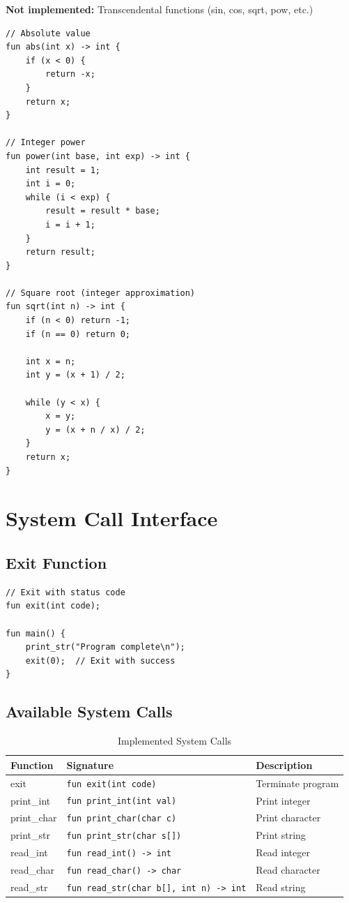 \documentclass[12pt,a4paper,oneside]{book}
\newcommand{\code}[1]{\texttt{#1}}
\begin{document}
\textbf{Not implemented:} Transcendental functions (sin, cos, sqrt, pow, etc.)

\begin{lstlisting}[style=algo, caption={User-Implemented Math Functions}]
// Absolute value
fun abs(int x) -> int {
    if (x < 0) {
        return -x;
    }
    return x;
}

// Integer power
fun power(int base, int exp) -> int {
    int result = 1;
    int i = 0;
    while (i < exp) {
        result = result * base;
        i = i + 1;
    }
    return result;
}

// Square root (integer approximation)
fun sqrt(int n) -> int {
    if (n < 0) return -1;
    if (n == 0) return 0;
    
    int x = n;
    int y = (x + 1) / 2;
    
    while (y < x) {
        x = y;
        y = (x + n / x) / 2;
    }
    return x;
}
\end{lstlisting}

\section{System Call Interface}

\subsection{Exit Function}

\begin{lstlisting}[style=algo, caption={Program Termination}]
// Exit with status code
fun exit(int code);

fun main() {
    print_str("Program complete\n");
    exit(0);  // Exit with success
}
\end{lstlisting}

\subsection{Available System Calls}

\begin{table}[H]
\centering
\caption{Implemented System Calls}
\small
\begin{tabularx}{\textwidth}{|l|l|X|}
\hline
\textbf{Function} & \textbf{Signature} & \textbf{Description} \\
\hline
exit & \code{fun exit(int code)} & Terminate program \\
\hline
print\_int & \code{fun print\_int(int val)} & Print integer \\
\hline
print\_char & \code{fun print\_char(char c)} & Print character \\
\hline
print\_str & \code{fun print\_str(char s[])} & Print string \\
\hline
read\_int & \code{fun read\_int() -> int} & Read integer \\
\hline
read\_char & \code{fun read\_char() -> char} & Read character \\
\hline
read\_str & \code{fun read\_str(char b[], int n) -> int} & Read string \\
\hline
\end{tabularx}
\end{table}
\end{document}
